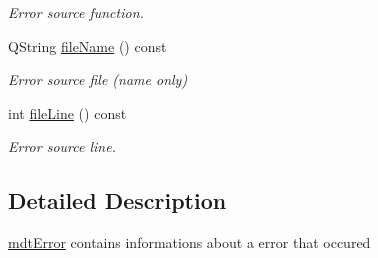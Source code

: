 \begin{DoxyCompactItemize}
\begin{DoxyCompactList}\small\item\em Error source function. \end{DoxyCompactList}\item 
\hypertarget{classmdt_error_af7c2c371678ebd45698a990502addbd8}{
QString \hyperlink{classmdt_error_af7c2c371678ebd45698a990502addbd8}{fileName} () const }
\label{classmdt_error_af7c2c371678ebd45698a990502addbd8}

\begin{DoxyCompactList}\small\item\em Error source file (name only) \end{DoxyCompactList}\item 
\hypertarget{classmdt_error_a7f5a9ac5e896ba24009bcadddcfe79cb}{
int \hyperlink{classmdt_error_a7f5a9ac5e896ba24009bcadddcfe79cb}{fileLine} () const }
\label{classmdt_error_a7f5a9ac5e896ba24009bcadddcfe79cb}

\begin{DoxyCompactList}\small\item\em Error source line. \end{DoxyCompactList}\end{DoxyCompactItemize}


\subsection{Detailed Description}
\hyperlink{classmdt_error}{mdtError} contains informations about a error that occured 

